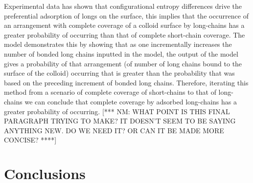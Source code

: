 \documentclass[journal=mamobx,manuscript=article]{achemso}
\begin{document}

Experimental data has shown that configurational entropy differences drive the preferential adsorption of longs on the surface, this implies that the occurrence of an arrangement with complete coverage of a colloid surface by long-chains has a greater probability of occurring than that of complete short-chain coverage. The model demonstrates this by showing that as one incrementally increases the number of bonded long chains inputted in the model, the output of the model gives a probability of that arrangement (of number of long chains bound to the surface of the colloid) occurring that is greater than the probability that was based on the preceding increment of bonded long chains. Therefore, iterating this method from a scenario of complete coverage of short-chains to that of long-chains we can conclude that complete coverage by adsorbed long-chains has a greater probability of occurring.
[*** NM:  WHAT POINT IS THIS FINAL PARAGRAPH TRYING TO MAKE?  IT DOESN'T SEEM TO BE SAYING ANYTHING NEW.  DO WE NEED IT? 
OR CAN IT BE MADE MORE CONCISE?  ****]




\section{Conclusions}
\end{document}
